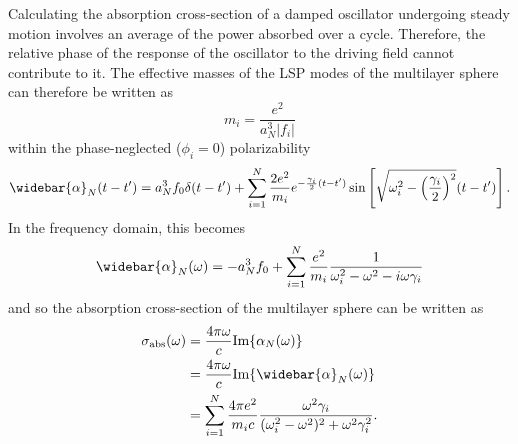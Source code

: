 \documentclass{article}
\begin{document}
Calculating the absorption cross-section of a damped oscillator undergoing steady motion involves an average of the power absorbed over a cycle. Therefore, the relative phase of the response of the oscillator to the driving field cannot contribute to it. The effective masses of the LSP modes of the multilayer sphere can therefore be written as
\begin{equation}
m_i = \frac{e^2}{a_N^3|f_i|}
\end{equation}
within the phase-neglected ($\phi_i = 0$) polarizability
\begin{equation}
\widebar{\alpha}_N(t - t') = a_N^3f_0\delta(t - t') + \sum_{i=1}^N \frac{2e^2}{m_i}e^{-\frac{\gamma_i}{2}(t-t')}\sin\left[\sqrt{\omega_i^2 - \left(\frac{\gamma_i}{2}\right)^2}(t - t')\right].
\end{equation}
In the frequency domain, this becomes
\begin{equation}
\widebar{\alpha}_N(\omega) = -a_N^3f_0 + \sum_{i=1}^N\frac{e^2}{m_i}\frac{1}{\omega_i^2 - \omega^2 - i\omega\gamma_i}
\end{equation} 
and so the absorption cross-section of the multilayer sphere can be written as
\begin{equation}
\begin{split}
\sigma_\text{abs}(\omega) &= \frac{4\pi\omega}{c}\text{Im}\{\alpha_N(\omega)\}\\
&= \frac{4\pi\omega}{c}\text{Im}\{\widebar{\alpha}_N(\omega)\}\\
&= \sum_{i=1}^N\frac{4\pi e^2}{m_ic}\frac{\omega^2\gamma_i}{(\omega_i^2 - \omega^2)^2 + \omega^2\gamma_i^2}.
\end{split}
\end{equation}
\end{document}
